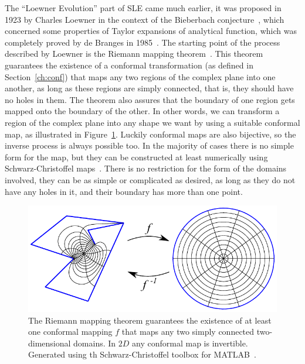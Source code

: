 The ``Loewner Evolution'' part of SLE came much earlier, it was proposed in
1923 by Charles Loewner in the context of the Bieberbach
conjecture~\cite{Loewner1923}, which concerned some properties of Taylor
expansions of analytical function, which was completely proved by de Branges in
1985~\cite{DeBranges1985}. The starting point of the process described by
Loewner is the Riemann mapping theorem~\cite{Ahlfors1979}. This theorem
guarantees the existence of a conformal transformation (as defined in
Section~\ref{ch:conf}) that maps any two regions of the complex plane into one
another, as long as these regions are simply connected, that is, they should
have no holes in them. The theorem also assures that the boundary of one region
gets mapped onto the boundary of the other. In other words, we can transform a
region of the complex plane into any shape we want by using a suitable
conformal map, as illustrated in Figure~\ref{fig:scmap}. Luckily conformal maps
are also bijective, so the inverse process is always possible too. In the
majority of cases there is no simple form for the map, but they can be
constructed at least numerically using Schwarz-Christoffel
maps~\cite{Driscoll2002}. There is no restriction for the form of the domains
involved, they can be as simple or complicated as desired, as long as they do
not have any holes in it, and their boundary has more than one point.

\begin{figure}[t]
\begin{center}
    \includegraphics[scale=1.0]{chapters/ch4-sle/figs/scmap}
\end{center}
\caption{The Riemann mapping theorem guarantees the existence of at least one
    conformal mapping $f$ that maps any two simply connected two-dimensional
    domains. In $2D$ any conformal map is invertible. Generated using th
    Schwarz-Christoffel toolbox for MATLAB~\cite{Driscoll2005}.}
\label{fig:scmap}
\end{figure}



